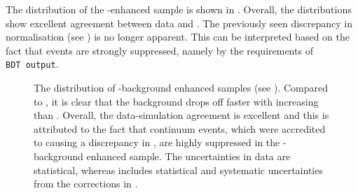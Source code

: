 The \EB distribution of the \BB-enhanced sample is shown in .
Overall, the distributions show excellent agreement between data and \MC.
The previously seen discrepancy in normalisation (see ) is no longer apparent.
This can be interpreted based on the fact that \epem\ra\qqbar events are strongly suppressed, namely 
by the requirements of \texttt{BDT~output}.
\begin{figure}[hbtp!]
    \centering
    \caption{\label{fig:bbbar_enhanced_eb} The \EB distribution of \BB-background enhanced samples (see ).
    Compared to , it is clear that the \BB background drops off faster with increasing \EB than \epem\ra\qqbar.
    Overall, the data-simulation agreement is excellent and this is attributed to the fact that continuum events, which were accredited to causing a discrepancy in , are highly suppressed in the \BB-background enhanced sample.
    The uncertainties in data are statistical, whereas \MC includes statistical and systematic uncertainties from the corrections in .
    }
\end{figure}

